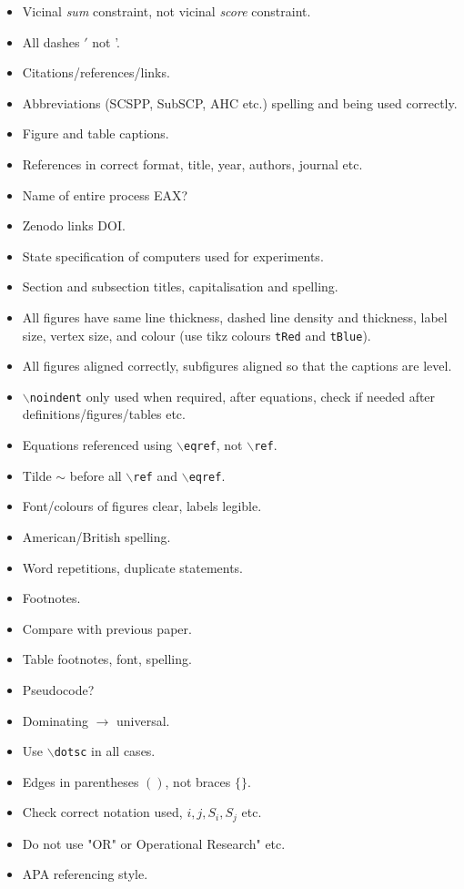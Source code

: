 \documentclass{elsarticle}
\begin{document}
{\color{myAqua}
\begin{itemize}[leftmargin=*]
	\item Vicinal \emph{sum} constraint, not vicinal \emph{score} constraint.
	\item All dashes $'$ not '. 
	\item Citations/references/links.
	\item Abbreviations (SCSPP, SubSCP, AHC etc.) spelling and being used correctly.
	\item Figure and table captions.
	\item References in correct format, title, year, authors, journal etc.
	\item Name of entire process EAX?
	\item Zenodo links DOI.
	\item State specification of computers used for experiments.
	\item Section and subsection titles, capitalisation and spelling.
	\item All figures have same line thickness, dashed line density and thickness, label size, vertex size, and colour (use tikz colours \texttt{tRed} and \texttt{tBlue}).
	\item All figures aligned correctly, subfigures aligned so that the captions are level.
	\item \texttt{$\backslash$noindent} only used when required, after equations, check if needed after definitions/figures/tables etc.
	\item Equations referenced using \texttt{$\backslash$eqref}, not \texttt{$\backslash$ref}.
	\item Tilde $\sim$ before all \texttt{$\backslash$ref} and \texttt{$\backslash$eqref}.
	\item Font/colours of figures clear, labels legible.
	\item American/British spelling.
	\item Word repetitions, duplicate statements.
	\item Footnotes.
	\item Compare with previous paper.
	\item Table footnotes, font, spelling.
	\item Pseudocode?
	\item Dominating $\to$ universal.
	\item Use \texttt{$\backslash$dotsc} in all cases.
	\item Edges in parentheses $()$, not braces $\{\}$.
	\item Check correct notation used, $i, j, S_i, S_j$ etc.
	\item Do not use "OR" or Operational Research" etc.
	\item APA referencing style.
\end{itemize}		
}



\end{document}
